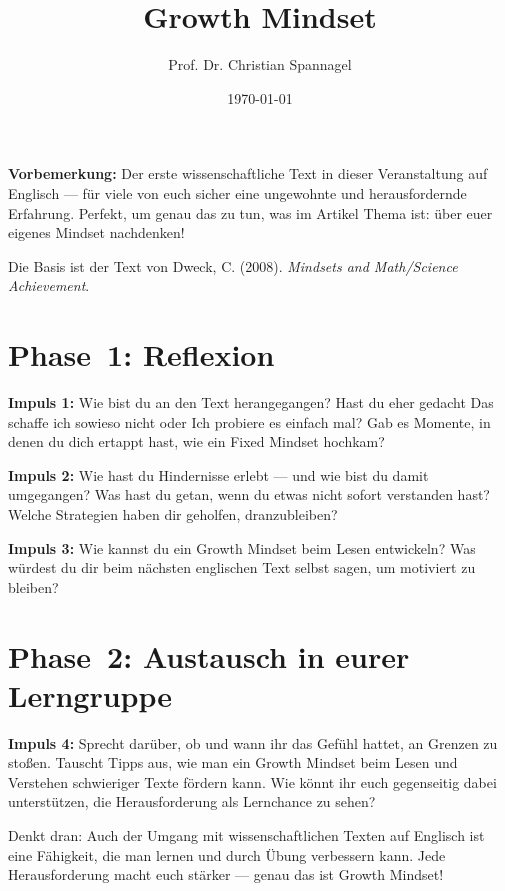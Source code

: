 \documentclass{../cssheet}
\title{Growth Mindset}
\author{Prof. Dr. Christian Spannagel}
\date{\today}
\begin{document}
\printtitle

\textbf{Vorbemerkung:}  Der erste wissenschaftliche Text in dieser Veranstaltung auf Englisch — für viele von euch sicher eine ungewohnte und herausfordernde Erfahrung. Perfekt, um genau das zu tun, was im Artikel Thema ist: über euer eigenes Mindset nachdenken!

Die Basis ist der Text von Dweck, C. (2008). \emph{Mindsets and  Math/Science Achievement}.

\section*{Phase~1: Reflexion}

\textbf{Impuls 1:}  Wie bist du an den Text herangegangen? Hast du eher gedacht \glqq{}Das schaffe ich sowieso nicht\grqq{} oder \glqq{}Ich probiere es einfach mal\grqq{}? Gab es Momente, in denen du dich ertappt hast, wie ein Fixed Mindset hochkam?

\textbf{Impuls 2:} Wie hast du Hindernisse erlebt --- und wie bist du damit umgegangen? Was hast du getan, wenn du etwas nicht sofort verstanden hast? Welche Strategien haben dir geholfen, dranzubleiben? 

\textbf{Impuls 3:} Wie kannst du ein Growth Mindset beim Lesen entwickeln? Was würdest du dir beim nächsten englischen Text selbst sagen, um motiviert zu bleiben?

\section*{Phase~2: Austausch in eurer Lerngruppe}

\textbf{Impuls 4:} Sprecht darüber, ob und wann ihr das Gefühl hattet, an Grenzen zu stoßen. Tauscht Tipps aus, wie man ein Growth Mindset beim Lesen und Verstehen schwieriger Texte fördern kann. Wie könnt ihr euch gegenseitig dabei unterstützen, die Herausforderung als Lernchance zu sehen?

Denkt dran: Auch der Umgang mit wissenschaftlichen Texten auf Englisch ist eine Fähigkeit, die man lernen und durch Übung verbessern kann. Jede Herausforderung macht euch stärker --- genau das ist Growth Mindset! 

\vspace*{10mm}
\printlicense

\printsocials
\end{document}

